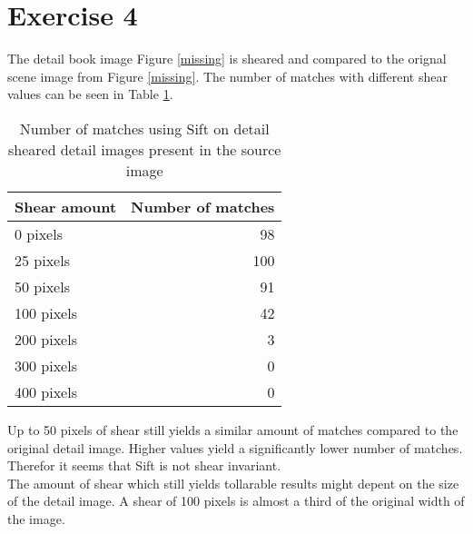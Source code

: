 \documentclass[11pt,a4paper]{article}
\begin{document}
\section*{Exercise 4}
The detail book image Figure \ref{missing} is sheared and compared to the orignal scene image from Figure \ref{missing}.
The number of matches with different shear values can be seen in Table \ref{tab:sheared}.
\begin{table}[H]
\centering
\begin{tabular}{l|r}
Shear amount  & Number of matches\\
\hline
0 pixels & 98\\
25 pixels & 100\\
50 pixels & 91\\
100 pixels & 42\\
200 pixels & 3\\
300 pixels & 0\\
400 pixels & 0
\end{tabular}
\caption{Number of matches using Sift on detail sheared detail images present in the source image}
\label{tab:sheared}
\end{table}
\noindent Up to 50 pixels of shear still yields a similar amount of matches compared to the original detail image.
Higher values yield a significantly lower number of matches. Therefor it seems that Sift is not shear invariant.\\

\noindent The amount of shear which still yields tollarable results might depent on the size of the detail image. A shear of 100 pixels is almost a third of the original width of the image.

\end{document}
